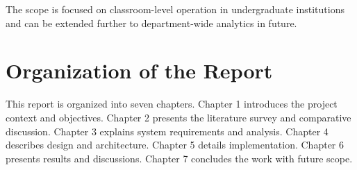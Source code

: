 The scope is focused on classroom-level operation in undergraduate institutions and can be extended further to department-wide analytics in future.

\section{Organization of the Report}
This report is organized into seven chapters. Chapter 1 introduces the project context and objectives. Chapter 2 presents the literature survey and comparative discussion. Chapter 3 explains system requirements and analysis. Chapter 4 describes design and architecture. Chapter 5 details implementation. Chapter 6 presents results and discussions. Chapter 7 concludes the work with future scope.

